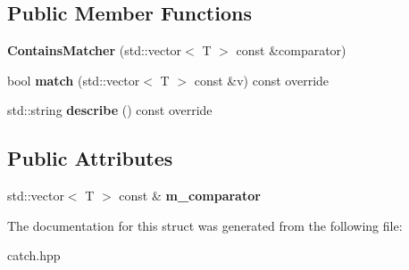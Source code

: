 \subsection*{Public Member Functions}
\begin{DoxyCompactItemize}
\item 
{\bfseries Contains\+Matcher} (std\+::vector$<$ T $>$ const \&comparator)\hypertarget{structCatch_1_1Matchers_1_1Vector_1_1ContainsMatcher_ad8e92c8399be6dce75bb5702cdfab700}{}\label{structCatch_1_1Matchers_1_1Vector_1_1ContainsMatcher_ad8e92c8399be6dce75bb5702cdfab700}

\item 
bool {\bfseries match} (std\+::vector$<$ T $>$ const \&v) const override\hypertarget{structCatch_1_1Matchers_1_1Vector_1_1ContainsMatcher_afd33467ae48a41a634572b41b053f67f}{}\label{structCatch_1_1Matchers_1_1Vector_1_1ContainsMatcher_afd33467ae48a41a634572b41b053f67f}

\item 
std\+::string {\bfseries describe} () const override\hypertarget{structCatch_1_1Matchers_1_1Vector_1_1ContainsMatcher_abe6a9ea3d6506c9a1f75ff524f35832e}{}\label{structCatch_1_1Matchers_1_1Vector_1_1ContainsMatcher_abe6a9ea3d6506c9a1f75ff524f35832e}

\end{DoxyCompactItemize}
\subsection*{Public Attributes}
\begin{DoxyCompactItemize}
\item 
std\+::vector$<$ T $>$ const \& {\bfseries m\+\_\+comparator}\hypertarget{structCatch_1_1Matchers_1_1Vector_1_1ContainsMatcher_a83d051166e4ed0d535219ad6ee99abb2}{}\label{structCatch_1_1Matchers_1_1Vector_1_1ContainsMatcher_a83d051166e4ed0d535219ad6ee99abb2}

\end{DoxyCompactItemize}


The documentation for this struct was generated from the following file\+:\begin{DoxyCompactItemize}
\item 
catch.\+hpp\end{DoxyCompactItemize}
